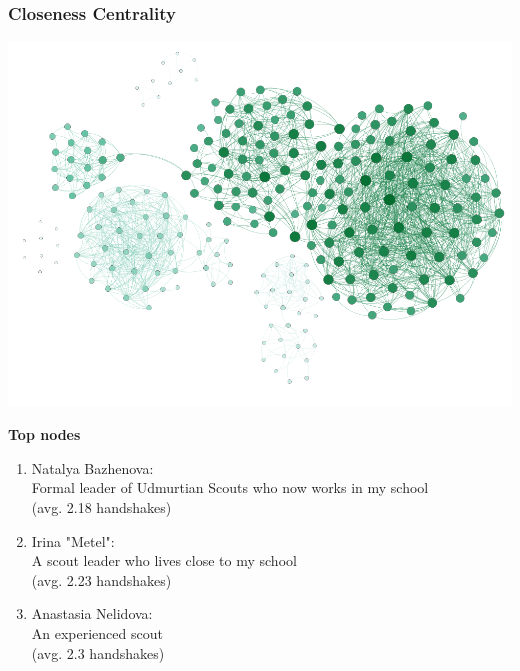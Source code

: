 \documentclass{beamer}
\begin{document}
\begin{frame}
\frametitle{Closeness Centrality}
\begin{multicols}{2}
	\includegraphics[width=\columnwidth]{Closeness_centr.png}
	\columnbreak
	
	\textbf{Top nodes}
	\begin{enumerate}
	\item Natalya Bazhenova:\\Formal leader of Udmurtian Scouts who now works in my school\\(avg. 2.18 handshakes)
	\item Irina "Metel":\\A scout leader who lives close to my school\\(avg. 2.23 handshakes)
	\item Anastasia Nelidova:\\An experienced scout\\(avg. 2.3 handshakes)
	\end{enumerate}
\end{multicols}

\end{frame}
\end{document}
